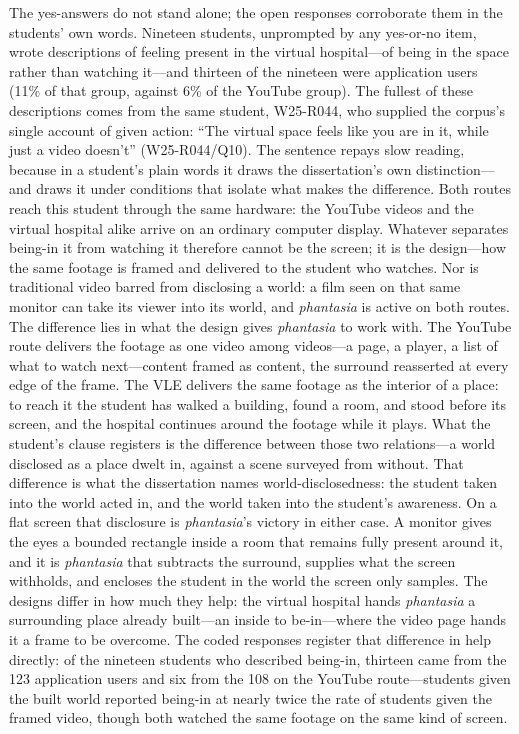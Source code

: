 The yes-answers do not stand alone; the open responses corroborate them
in the students' own words. Nineteen students, unprompted by any
yes-or-no item, wrote descriptions of feeling present in the virtual
hospital---of being in the space rather than watching it---and thirteen
of the nineteen were application users (11\% of that group, against 6\%
of the YouTube group). The fullest of these descriptions comes from the
same student, W25-R044, who supplied the corpus's single account of given
action: ``The virtual space feels like you are in it, while just a video
doesn't'' (W25-R044/Q10). The sentence repays slow reading, because in a
student's plain words it draws the dissertation's own distinction---and
draws it under conditions that isolate what makes the difference. Both
routes reach this student through the same hardware: the YouTube videos
and the virtual hospital alike arrive on an ordinary computer display.
Whatever separates being-in it from watching it therefore cannot be the
screen; it is the design---how the same footage is framed and delivered
to the student who watches. Nor is traditional video barred from
disclosing a world: a film seen on that same monitor can take its viewer
into its world, and \textit{phantasia} is active on both routes. The
difference lies in what the design gives \textit{phantasia} to work
with. The YouTube route delivers the footage as one video among
videos---a page, a player, a list of what to watch next---content framed
as content, the surround reasserted at every edge of the frame. The VLE
delivers the same footage as the interior of a place: to reach it the
student has walked a building, found a room, and stood before its
screen, and the hospital continues around the footage while it plays.
What the student's clause registers is the difference between those two
relations---a world disclosed as a place dwelt in, against a scene
surveyed from without. That difference is what the dissertation names
world-disclosedness: the student taken into the world acted in, and the
world taken into the student's awareness. On a flat screen that
disclosure is \textit{phantasia}'s victory in either case. A monitor
gives the eyes a bounded rectangle inside a room that remains fully
present around it, and it is \textit{phantasia} that subtracts the
surround, supplies what the screen withholds, and encloses the student
in the world the screen only samples. The designs differ in how much
they help: the virtual hospital hands \textit{phantasia} a surrounding
place already built---an inside to be-in---where the video page hands it
a frame to be overcome. The coded responses register that difference in
help directly: of the nineteen students who described being-in, thirteen
came from the 123 application users and six from the 108 on the YouTube
route---students given the built world reported being-in at nearly twice
the rate of students given the framed video, though both watched the
same footage on the same kind of screen.

